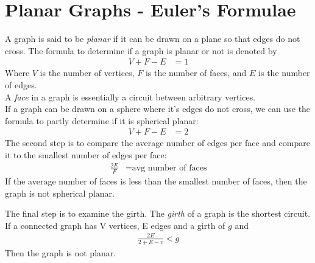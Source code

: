 \section{Planar Graphs - Euler's Formulae}
A graph is said to be \emph{planar} if it can be drawn on a plane so that edges
do not cross. The formula to determine if a graph is planar or not is denoted by
\begin{align}
  V + F - E & = 1
\end{align}
Where $V$ is the number of vertices, $F$ is the number of faces, and $E$ is the
number of edges.
\\
A \emph{face} in a graph is essentially a circuit between arbitrary vertices.
\\
If a graph can be drawn on a sphere where it's edges do not cross, we can use
the formula to partly determine if it is spherical planar:
\begin{align}
  V + F - E & = 2
\end{align}
The second step is to compare the average number of edges per face and compare
it to the smallest number of edges per face:
\begin{align}
  \frac{2E}{F} & = \text{avg number of faces}
\end{align}
If the average number of faces is less than the smallest number of faces, then
the graph is not spherical planar.

The final step is to examine the girth. The \emph{girth} of a graph is the
shortest circuit. If a connected graph has V vertices, E edges and a girth of $g$ and
\begin{align}
  \frac{2E}{2+E-v} < g
\end{align}
Then the graph is not planar.